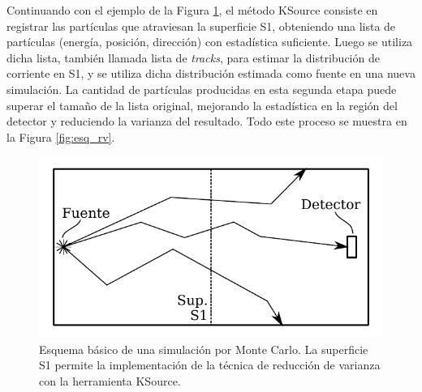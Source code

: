 Continuando con el ejemplo de la Figura \ref{fig:esq_mc}, el método KSource consiste en registrar las partículas que atraviesan la superficie S1, obteniendo una lista de partículas (energía, posición, dirección) con estadística suficiente. Luego se utiliza dicha lista, también llamada lista de \emph{tracks}, para estimar la distribución de corriente en S1, y se utiliza dicha distribución estimada como fuente en una nueva simulación. La cantidad de partículas producidas en esta segunda etapa puede superar el tamaño de la lista original, mejorando la estadística en la región del detector y reduciendo la varianza del resultado. Todo este proceso se muestra en la Figura \ref{fig:esq_rv}. 

\begin{figure}[h!]
    \centering
    \includegraphics[width=.8\textwidth]{figs/esquema_simul.pdf}
    \caption{Esquema básico de una simulación por Monte Carlo. La superficie S1 permite la implementación de la técnica de reducción de varianza con la herramienta KSource.}
    \label{fig:esq_mc}
\end{figure}

